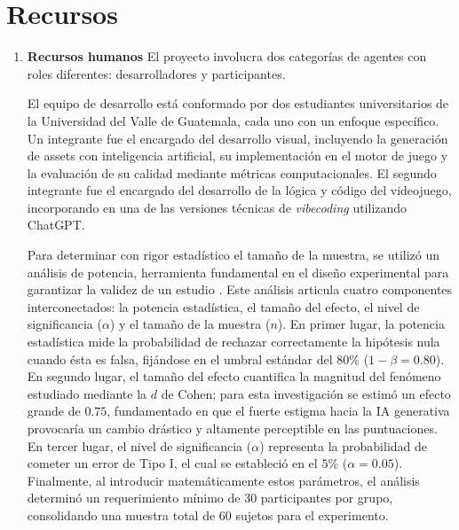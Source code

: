 \section{Recursos}
\begin{enumerate}[label=\alph*]
    \item \textbf{Recursos humanos}\newline
    El proyecto involucra dos categorías de agentes con roles diferentes: desarrolladores y participantes.
    
    El equipo de desarrollo está conformado por dos estudiantes universitarios de la Universidad del Valle de Guatemala, cada uno con un enfoque específico. Un integrante fue el encargado del desarrollo visual, incluyendo la generación de assets con inteligencia artificial, su implementación en el motor de juego y la evaluación de su calidad mediante métricas computacionales. El segundo integrante fue el encargado del desarrollo de la lógica y código del videojuego, incorporando en una de las versiones técnicas de \textit{vibecoding} utilizando ChatGPT.

    Para determinar con rigor estadístico el tamaño de la muestra, se utilizó un análisis de potencia, herramienta fundamental en el diseño experimental para garantizar la validez de un estudio \cite{abbadia2025analisis}. Este análisis articula cuatro componentes interconectados: la potencia estadística, el tamaño del efecto, el nivel de significancia ($\alpha$) y el tamaño de la muestra ($n$). En primer lugar, la potencia estadística mide la probabilidad de rechazar correctamente la hipótesis nula cuando ésta es falsa, fijándose en el umbral estándar del $80\%$ ($1 - \beta = 0.80$). En segundo lugar, el tamaño del efecto cuantifica la magnitud del fenómeno estudiado mediante la $d$ de Cohen; para esta investigación se estimó un efecto grande de $0.75$, fundamentado en que el fuerte estigma hacia la IA generativa provocaría un cambio drástico y altamente perceptible en las puntuaciones. En tercer lugar, el nivel de significancia ($\alpha$) representa la probabilidad de cometer un error de Tipo I, el cual se estableció en el $5\%$ ($\alpha = 0.05$). Finalmente, al introducir matemáticamente estos parámetros, el análisis determinó un requerimiento mínimo de 30 participantes por grupo, consolidando una muestra total de 60 sujetos para el experimento.


\end{enumerate}
